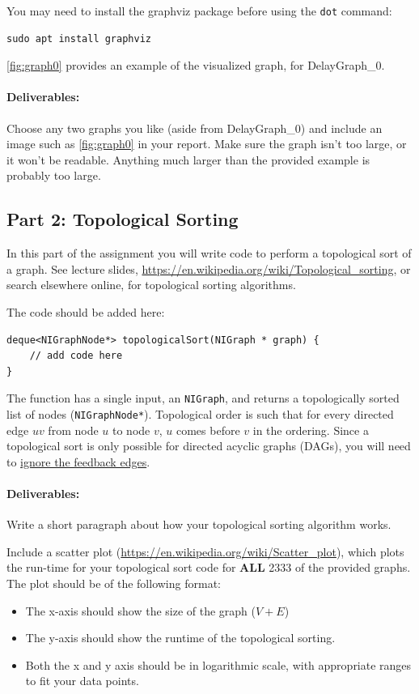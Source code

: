 You may need to install the graphviz package before using the {\tt dot} command:
\begin{lstlisting}
sudo apt install graphviz
\end{lstlisting}

\cref{fig:graph0} provides an example of the visualized graph, for DelayGraph\_0.


\paragraph{Deliverables:} Choose any two graphs you like (aside from DelayGraph\_0) and include an image such as \cref{fig:graph0} in your report.  Make sure the graph isn't too large, or it won't be readable.  Anything much larger than the provided example is probably too large.  

\subsection{Part 2: Topological Sorting}
\label{sec:del2}
In this part of the assignment you will write code to perform a topological sort of a graph.  See lecture slides, \url{https://en.wikipedia.org/wiki/Topological_sorting}, or search elsewhere online, for topological sorting algorithms.  


The code should be added here:
\begin{lstlisting}
deque<NIGraphNode*> topologicalSort(NIGraph * graph) {
	// add code here
}
\end{lstlisting}
The function has a single input, an {\tt NIGraph}, and returns a topologically sorted list of nodes ({\tt NIGraphNode*}).  Topological order is such that for every directed edge $uv$ from node $u$ to node $v$, $u$ comes before $v$ in the ordering.  Since a topological sort is only possible for directed acyclic graphs (DAGs), you will need to \uline{ignore the feedback edges}.  

\paragraph{Deliverables:} Write a short paragraph about how your topological sorting algorithm works.  

Include a scatter plot (\url{https://en.wikipedia.org/wiki/Scatter_plot}), which plots the run-time for your topological sort code for {\bf ALL} 2333 of the provided graphs.  The plot should be of the following format:
\begin{itemize}
	\item The x-axis should show the size of the graph ($V + E$)
	\item The y-axis should show the runtime of the topological sorting.
	\item Both the x and y axis should be in logarithmic scale, with appropriate ranges to fit your data points.
\end{itemize}


